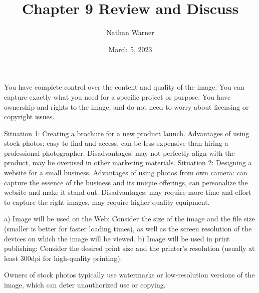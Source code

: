 \documentclass{report}
\title{\Huge{Chapter 9 Review and Discuss}}
\author{\huge{Nathan Warner}}
\date{\huge{March 5, 2023}}
\begin{document}
    \maketitle
    \noindent
    \bigbreak \noindent 
    \bigbreak \noindent 
    You have complete control over the content and quality of the image.
You can capture exactly what you need for a specific project or purpose.
You have ownership and rights to the image, and do not need to worry about licensing or copyright issues.

    \bigbreak \noindent \bigbreak \noindent 
    \bigbreak \noindent 
    \bigbreak \noindent 
    Situation 1: Creating a brochure for a new product launch. Advantages of using stock photos: easy to find and access, can be less expensive than hiring a professional photographer. Disadvantages: may not perfectly align with the product, may be overused in other marketing materials.
Situation 2: Designing a website for a small business. Advantages of using photos from own camera: can capture the essence of the business and its unique offerings, can personalize the website and make it stand out. Disadvantages: may require more time and effort to capture the right images, may require higher quality equipment.

    \bigbreak \noindent \bigbreak \noindent 
    \bigbreak \noindent 
    \bigbreak \noindent 
    a) Image will be used on the Web: Consider the size of the image and the file size (smaller is better for faster loading times), as well as the screen resolution of the devices on which the image will be viewed.
b) Image will be used in print publishing: Consider the desired print size and the printer's resolution (usually at least 300dpi for high-quality printing).


    \bigbreak \noindent \bigbreak \noindent 
    \bigbreak \noindent 
    \bigbreak \noindent 
    Owners of stock photos typically use watermarks or low-resolution versions of the image, which can deter unauthorized use or copying.
\end{document}
